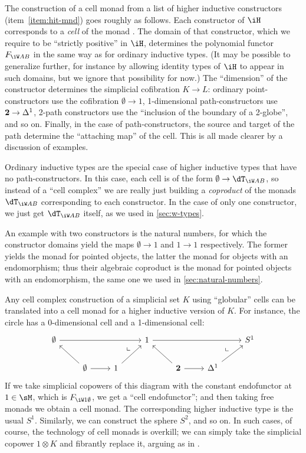 \documentclass{amsart}
\let\W\iW
\begin{document}
The construction of a cell monad from a list of higher inductive constructors (item~\ref{item:hit-mnd}) goes roughly as follows.
Each constructor of $\iH$ corresponds to a \emph{cell} of the monad \dT.
The domain of that constructor, which we require to be ``strictly positive'' in $\iH$, determines the polynomial functor $F_{\W A B}$ in the same way as for ordinary inductive types.
(It may be possible to generalize further, for instance by allowing identity types of $\iH$ to appear in such domains, but we ignore that possibility for now.)
The ``dimension'' of the constructor determines the simplicial cofibration $K\to L$: ordinary point-constructors use the cofibration $\emptyset\to 1$, 1-dimensional path-constructors use $\mathbf{2}\to{\Delta^1}$, 2-path constructors use the ``inclusion of the boundary of a 2-globe'', and so on.
Finally, in the case of path-constructors, the source and target of the path determine the ``attaching map'' of the cell.
This is all made clearer by a discussion of examples.

\begin{eg}
  Ordinary inductive types are the special case of higher inductive types that have no path-constructors.
  In this case, each cell is of the form $\emptyset \to \dT_{\W A B}$, so instead of a ``cell complex'' we are really just building a \emph{coproduct} of the monads $\dT_{\W A B}$ corresponding to each constructor.
  In the case of only one constructor, we just get $\dT_{\W A B}$ itself, as we used in \cref{sec:w-types}.

  An example with two constructors is the natural numbers, for which the constructor domains yield the maps $\emptyset\to 1$ and $1\to 1$ respectively.
  The former yields the monad for pointed objects, the latter the monad for objects with an endomorphism; thus their algebraic coproduct is the monad for pointed objects with an endomorphism, the same one we used in \cref{sec:natural-numbers}.
\end{eg}

\begin{eg}\label{thm:glob-cx}
  Any cell complex construction of a simplicial set $K$ using ``globular'' cells can be translated into a cell monad for a higher inductive version of $K$.
  For instance, the circle has a 0-dimensional cell and a 1-dimensional cell:
  \[
  \begin{tikzcd}
    \emptyset \ar[rrr] &&& 1 \ar[rrr] &&& S^1 \\
    & \emptyset \ar[ul] \ar[r] \ar[urr,phantom,near end,"\llcorner"] & 1 \ar[ur] &
    & \mathbf{2} \ar[ul] \ar[r] \ar[urr,phantom,near end,"\llcorner"] & \ivl \ar[ur]
  \end{tikzcd}
  \]
  If we take simplicial copowers of this diagram with the constant endofunctor at $1\in \sM$, which is $F_{\W 1 \emptyset}$, we get a ``cell endofunctor''; and then taking free monads we obtain a cell monad.
  The corresponding higher inductive type is the usual $S^1$.
  Similarly, we can construct the sphere $S^2$, and so on.
  In such cases, of course, the technology of cell monads is overkill; we can simply take the simplicial copower $1\otimes K$ and fibrantly replace it, arguing as in .
\end{eg}
\end{document}
